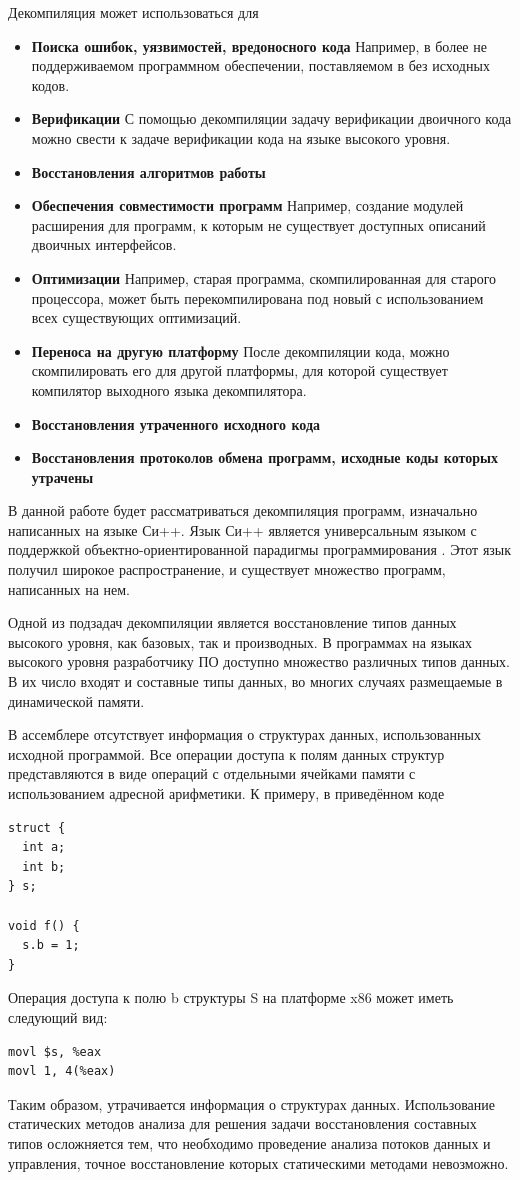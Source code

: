 \documentclass[a4paper,12pt,russian]{article}
\newcommand{\code}[1]{\textsf{#1}}
\begin{document}
Декомпиляция может использоваться для
\begin{itemize}
\item{\textbf{Поиска ошибок, уязвимостей, вредоносного кода}} Например, в более не поддерживаемом программном обеспечении, поставляемом в без исходных кодов.
\item{\textbf{Верификации}} С помощью декомпиляции задачу верификации двоичного кода можно свести к задаче верификации кода на языке высокого уровня.
\item{\textbf{Восстановления алгоритмов работы}}
\item{\textbf{Обеспечения совместимости программ}} Например, создание модулей расширения для программ, к которым не существует доступных описаний двоичных интерфейсов.
\item{\textbf{Оптимизации}} Например, старая программа, скомпилированная для старого процессора, может быть перекомпилирована под новый с использованием всех существующих оптимизаций.
\item{\textbf{Переноса на другую платформу}} После декомпиляции кода, можно скомпилировать его для другой платформы, для которой существует компилятор выходного языка декомпилятора.
\item{\textbf{Восстановления утраченного исходного кода}}
\item{\textbf{Восстановления протоколов обмена программ, исходные коды которых утрачены}}
\end{itemize}

В данной работе будет рассматриваться декомпиляция программ, изначально написанных на языке Си++.
Язык Си++ является универсальным языком с поддержкой объектно-ориентированной парадигмы программирования \cite{strstr}. Этот язык получил широкое распространение, и существует множество программ, написанных на нем.

Одной из подзадач декомпиляции является восстановление типов данных высокого уровня, как базовых, так и производных.
В программах на языках высокого уровня разработчику ПО доступно множество различных типов данных.
В их число входят и составные типы данных, во многих случаях размещаемые в динамической памяти.

В ассемблере отсутствует информация о структурах данных, использованных исходной программой.
Все операции доступа к полям данных структур представляются в виде операций с отдельными ячейками памяти с использованием адресной арифметики.
К примеру, в приведённом коде
\begin{lstlisting}
struct {
  int a;
  int b;
} s;

void f() {
  s.b = 1;
}
\end{lstlisting}
Операция доступа к полю \code{b} структуры \code{S} на платформе \code{x86} может иметь следующий вид:
\begin{lstlisting}[language={[x86masm]Assembler}]
movl $s, %eax
movl 1, 4(%eax)
\end{lstlisting}
Таким образом, утрачивается информация о структурах данных.
Использование статических методов анализа для решения задачи восстановления составных типов осложняется тем, что необходимо проведение анализа потоков данных и управления, точное восстановление которых статическими методами невозможно.
\end{document}
